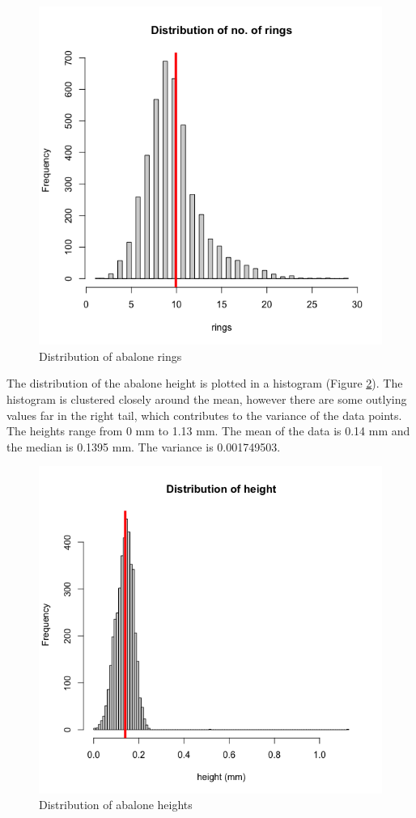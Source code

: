 \documentclass[11pt,letterpaper]{article}
\begin{document}
	\begin{figure}
		\centering
		\includegraphics[height=0.4\textheight]{2-rings}
		\caption{Distribution of abalone rings}
		\label{fig:rings}
	\end{figure}

	The distribution of the abalone height is plotted in a histogram (Figure \ref{fig:height}). The histogram is clustered closely around the mean, however there are some outlying values far in the right tail, which contributes to the variance of the data points. The heights range from 0 mm to 1.13 mm. The mean of the data is 0.14 mm and the median is 0.1395 mm. The variance is 0.001749503. 
	
	\begin{figure}
		\centering
		\includegraphics[height=0.4\textheight]{2-height}
		\caption{Distribution of abalone heights}
		\label{fig:height}
	\end{figure}
\end{document}
